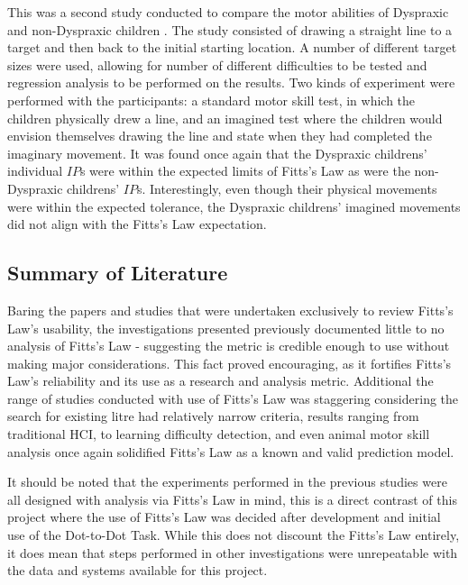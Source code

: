 		This was a second study conducted to compare the motor abilities of Dyspraxic and non-Dyspraxic children \cite{Wilson2001}. The study consisted of drawing a straight line to a target and then back to the initial starting location. A number of different target sizes were used, allowing for number of different difficulties to be tested and regression analysis to be performed on the results. Two kinds of experiment were performed with the participants: a standard motor skill test, in which the children physically drew a line, and an imagined test where the children would envision themselves drawing the line and state when they had completed the imaginary movement. It was found once again that the Dyspraxic childrens’ individual \(IP\)s were within the expected limits of Fitts’s Law as were the non-Dyspraxic childrens’ \(IP\)s. Interestingly, even though their physical movements were within the expected tolerance, the Dyspraxic childrens’ imagined movements did not align with the Fitts’s Law expectation.
	
	\subsection{Summary of Literature}
		Baring the papers and studies that were undertaken exclusively to review Fitts's Law's usability, the investigations presented previously documented little to no analysis of Fitts's Law - suggesting the metric is credible enough to use without making major considerations. This fact proved encouraging, as it fortifies Fitts's Law's reliability and its use as a research and analysis metric. Additional the range of studies conducted with use of Fitts's Law was staggering considering the search for existing litre had relatively narrow criteria, results ranging from traditional HCI, to learning difficulty detection, and even animal motor skill analysis once again solidified Fitts's Law as a known and valid prediction model.
		
		
		It should be noted that the experiments performed in the previous studies were all designed with analysis via Fitts's Law in mind, this is a direct contrast of this project where the use of Fitts's Law was decided after development and initial use of the Dot-to-Dot Task. While this does not discount the Fitts's Law entirely, it does mean that steps performed in other investigations were unrepeatable with the data and systems available for this project.
				
\newpage